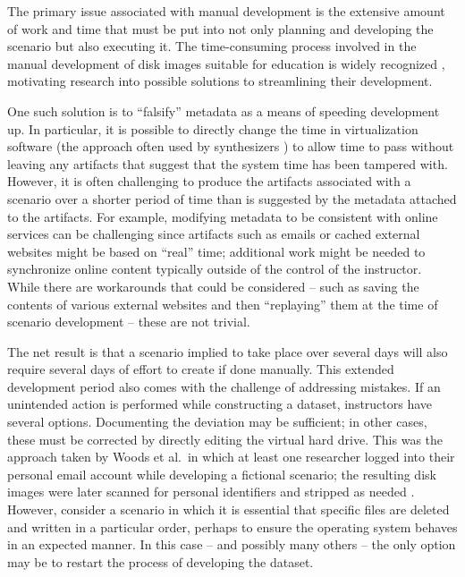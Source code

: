 \documentclass[letterpaper,12pt]{report}
\begin{document}
The primary issue associated with manual development is the extensive
amount of work and time that must be put into not only planning and
developing the scenario but also executing it. The time-consuming
process involved in the manual development of disk images suitable for
education is widely recognized
\cite{adelsteinAutomaticallyCreatingRealistic2005,gobelForTraceHolisticForensic2022,guptaDigitalForensicsLab2022,mochForensicImageGenerator2009,russellForensicImageDescription2012,scanlonEviPlantEfficientDigital2017,woodsCreatingRealisticCorpora2011},
motivating research into possible solutions to streamlining their
development.

One such solution is to ``falsify'' metadata as a means of speeding
development up. In particular, it is possible to directly change the
time in virtualization software (the approach often used by synthesizers
\cite{gobelForTraceHolisticForensic2022,mochForensicImageGenerator2009})
to allow time to pass without leaving any artifacts that suggest that
the system time has been tampered with. However, it is often challenging
to produce the artifacts associated with a scenario over a shorter
period of time than is suggested by the metadata attached to the
artifacts. For example, modifying metadata to be consistent with online
services can be challenging since artifacts such as emails or cached
external websites might be based on ``real'' time; additional work might
be needed to synchronize online content typically outside of the control
of the instructor. While there are workarounds that could be considered
-- such as saving the contents of various external websites and then
``replaying'' them at the time of scenario development -- these are not
trivial.

The net result is that a scenario implied to take place over several
days will also require several days of effort to create if done
manually. This extended development period also comes with the challenge
of addressing mistakes. If an unintended action is performed while
constructing a dataset, instructors have several options. Documenting
the deviation may be sufficient; in other cases, these must be corrected
by directly editing the virtual hard drive. This was the approach taken
by Woods et al.~in which at least one researcher logged into their
personal email account while developing a fictional scenario; the
resulting disk images were later scanned for personal identifiers and
stripped as needed \cite{woodsCreatingRealisticCorpora2011}.
However, consider a scenario in which it is essential that specific
files are deleted and written in a particular order, perhaps to ensure
the operating system behaves in an expected manner. In this case -- and
possibly many others -- the only option may be to restart the process of
developing the dataset.
\end{document}
